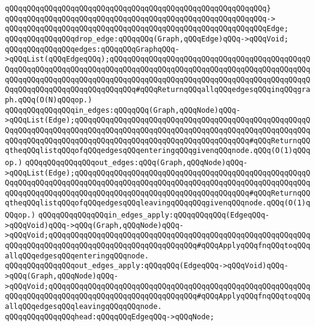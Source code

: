 \verb|qQQqqQQqqQQqqQQqqQQqqQQqqQQqqQQqqQQqqQQqqQQqqQQqqQQqqQQqqQQq}|\newline
\verb|qQQqqQQqqQQqqQQqqQQqqQQqqQQqqQQqqQQqqQQqqQQqqQQqqQQqqQQqqQQq->|\newline
\verb|qQQqqQQqqQQqqQQqqQQqqQQqqQQqqQQqqQQqqQQqqQQqqQQqqQQqqQQqqQQqEdge;|\newline
\newline
\verb|qQQqqQQqqQQqqQQqdrop_edge:qQQqqQQq(Graph,qQQqEdge)qQQq->qQQqVoid;|\newline
\newline
\verb|qQQqqQQqqQQqqQQqedges:qQQqqQQqGraphqQQq->qQQqList(qQQqEdgeqQQq);qQQqqQQqqQQqqQQqqQQqqQQqqQQqqQQqqQQqqQQqqQQqqQQqqQQqqQQqqQQqqQQqqQQqqQQqqQQqqQQqqQQqqQQqqQQqqQQqqQQqqQQqqQQqqQQqqQQqqQQqqQQqqQQqqQQqqQQqqQQqqQQqqQQqqQQqqQQqqQQqqQQqqQQqqQQqqQQqqQQqqQQqqQQqqQQqqQQqqQQqqQQqqQQqqQQqqQQq#qQQqReturnqQQqallqQQqedgesqQQqinqQQqgraph.qQQq(O(N)qQQqop.)|\newline
\newline
\verb|qQQqqQQqqQQqqQQqin_edges:qQQqqQQq(Graph,qQQqNode)qQQq->qQQqList(Edge);qQQqqQQqqQQqqQQqqQQqqQQqqQQqqQQqqQQqqQQqqQQqqQQqqQQqqQQqqQQqqQQqqQQqqQQqqQQqqQQqqQQqqQQqqQQqqQQqqQQqqQQqqQQqqQQqqQQqqQQqqQQqqQQqqQQqqQQqqQQqqQQqqQQqqQQqqQQqqQQqqQQqqQQqqQQqqQQqqQQq#qQQqReturnqQQqtheqQQqlistqQQqofqQQqedgesqQQqenteringqQQqgivenqQQqnode.qQQq(O(1)qQQqop.)|\newline
\verb|qQQqqQQqqQQqqQQqout_edges:qQQq(Graph,qQQqNode)qQQq->qQQqList(Edge);qQQqqQQqqQQqqQQqqQQqqQQqqQQqqQQqqQQqqQQqqQQqqQQqqQQqqQQqqQQqqQQqqQQqqQQqqQQqqQQqqQQqqQQqqQQqqQQqqQQqqQQqqQQqqQQqqQQqqQQqqQQqqQQqqQQqqQQqqQQqqQQqqQQqqQQqqQQqqQQqqQQqqQQqqQQqqQQqqQQq#qQQqReturnqQQqtheqQQqlistqQQqofqQQqedgesqQQqleavingqQQqqQQqgivenqQQqnode.qQQq(O(1)qQQqop.)|\newline
\newline
\verb|qQQqqQQqqQQqqQQqin_edges_apply:qQQqqQQqqQQq(EdgeqQQq->qQQqVoid)qQQq->qQQq(Graph,qQQqNode)qQQq->qQQqVoid;qQQqqQQqqQQqqQQqqQQqqQQqqQQqqQQqqQQqqQQqqQQqqQQqqQQqqQQqqQQqqQQqqQQqqQQqqQQqqQQqqQQqqQQqqQQqqQQqqQQqqQQq#qQQqApplyqQQqfnqQQqtoqQQqallqQQqedgesqQQqenteringqQQqnode.|\newline
\verb|qQQqqQQqqQQqqQQqout_edges_apply:qQQqqQQq(EdgeqQQq->qQQqVoid)qQQq->qQQq(Graph,qQQqNode)qQQq->qQQqVoid;qQQqqQQqqQQqqQQqqQQqqQQqqQQqqQQqqQQqqQQqqQQqqQQqqQQqqQQqqQQqqQQqqQQqqQQqqQQqqQQqqQQqqQQqqQQqqQQqqQQqqQQq#qQQqApplyqQQqfnqQQqtoqQQqallqQQqedgesqQQqleavingqQQqqQQqnode.|\newline
\newline
\verb|qQQqqQQqqQQqqQQqhead:qQQqqQQqEdgeqQQq->qQQqNode;|\newline
